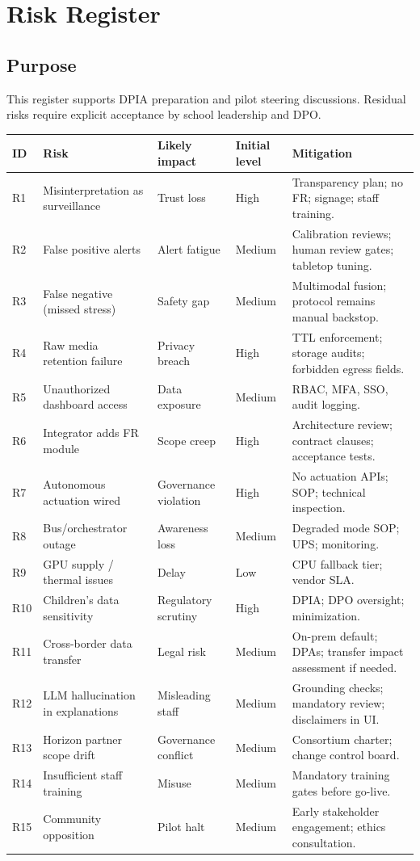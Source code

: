 \section{Risk Register}
\label{sec:risk-register}

\subsection{Purpose}

This register supports DPIA preparation and pilot steering discussions.
Residual risks require explicit acceptance by school leadership and DPO.

\begin{longtable}{@{}p{1.0cm}p{3.2cm}p{2.0cm}p{2.0cm}p{4.8cm}@{}}
\toprule
ID & Risk & Likely impact & Initial level & Mitigation \\
\midrule
\endhead
R1 &
  Misinterpretation as surveillance &
  Trust loss &
  High &
  Transparency plan; no FR; signage; staff training. \\
R2 &
  False positive alerts &
  Alert fatigue &
  Medium &
  Calibration reviews; human review gates; tabletop tuning. \\
R3 &
  False negative (missed stress) &
  Safety gap &
  Medium &
  Multimodal fusion; protocol remains manual backstop. \\
R4 &
  Raw media retention failure &
  Privacy breach &
  High &
  TTL enforcement; storage audits; forbidden egress fields. \\
R5 &
  Unauthorized dashboard access &
  Data exposure &
  Medium &
  RBAC, MFA, SSO, audit logging. \\
R6 &
  Integrator adds FR module &
  Scope creep &
  High &
  Architecture review; contract clauses; acceptance tests. \\
R7 &
  Autonomous actuation wired &
  Governance violation &
  High &
  No actuation APIs; SOP; technical inspection. \\
R8 &
  Bus/orchestrator outage &
  Awareness loss &
  Medium &
  Degraded mode SOP; UPS; monitoring. \\
R9 &
  GPU supply / thermal issues &
  Delay &
  Low &
  CPU fallback tier; vendor SLA. \\
R10 &
  Children's data sensitivity &
  Regulatory scrutiny &
  High &
  DPIA; DPO oversight; minimization. \\
R11 &
  Cross-border data transfer &
  Legal risk &
  Medium &
  On-prem default; DPAs; transfer impact assessment if needed. \\
R12 &
  LLM hallucination in explanations &
  Misleading staff &
  Medium &
  Grounding checks; mandatory review; disclaimers in UI. \\
R13 &
  Horizon partner scope drift &
  Governance conflict &
  Medium &
  Consortium charter; change control board. \\
R14 &
  Insufficient staff training &
  Misuse &
  Medium &
  Mandatory training gates before go-live. \\
R15 &
  Community opposition &
  Pilot halt &
  Medium &
  Early stakeholder engagement; ethics consultation. \\
\bottomrule
\end{longtable}


